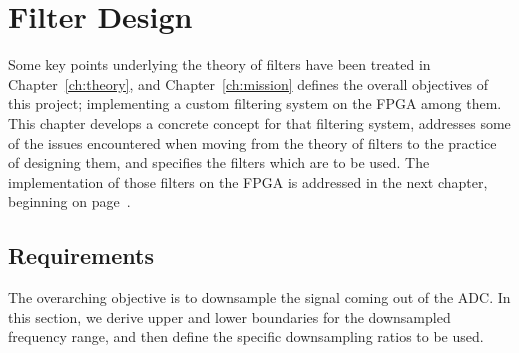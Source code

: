 %
%
\chapter{Filter Design} %
\label{ch:filter_design}
%
%

Some  key  points underlying  the  theory  of  filters  have been  treated  in
Chapter~\ref{ch:theory},  and  Chapter~\ref{ch:mission}  defines  the  overall
objectives of this project; implementing a custom filtering system on the FPGA
among  them.  This  chapter develops  a  concrete concept  for that  filtering
system, addresses some  of the issues encountered when moving  from the theory
of filters to the practice of  designing them, and specifies the filters which
are to be used.  The implementation of  those filters on the FPGA is addressed
in the next chapter, beginning on page~\pageref{ch:fpga}.


%
%
\section{Requirements} %
\label{sec:requirements}

The overarching objective  is to downsample the signal coming  out of the ADC.
In this  section, we  derive upper  and lower  boundaries for  the downsampled
frequency range, and then define the specific downsampling ratios to be used.

